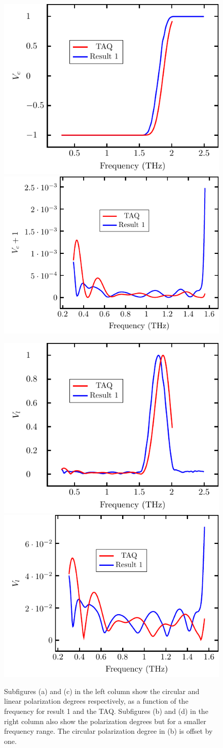 \begin{figure}[H]
\centering
\subcaptionbox{\label{fig:cl4_pol_deg_a}}
    {\hspace*{-2em}\includegraphics[width=0.45\linewidth]{images/results/plots/ceramic/polDeg/degCirc.pdf}}
\qquad
\subcaptionbox{\label{fig:cl4_pol_deg_b}}
    {\hspace*{-2em}\includegraphics[width=0.45\linewidth]{images/results/plots/ceramic/polDeg/degCircZoom.pdf}}

\subcaptionbox{\label{fig:cl4_pol_deg_c}}
    {\hspace*{-2em}\includegraphics[width=0.45\linewidth]{images/results/plots/ceramic/polDeg/degLin.pdf}}
\qquad
\subcaptionbox{\label{fig:cl4_pol_deg_d}}
    {\hspace*{-2em}\includegraphics[width=0.45\linewidth]{images/results/plots/ceramic/polDeg/degLinZoom.pdf}}
\caption{Subfigures (a) and (c) in the left column show the circular and linear polarization degrees respectively, as a function of the frequency for result 1 and the TAQ. Subfigures (b) and (d) in the right column also show the polarization degrees but for a smaller frequency range. The circular polarization degree in (b) is offset by one.}
\label{fig:cl4_pol_deg}
\end{figure}

